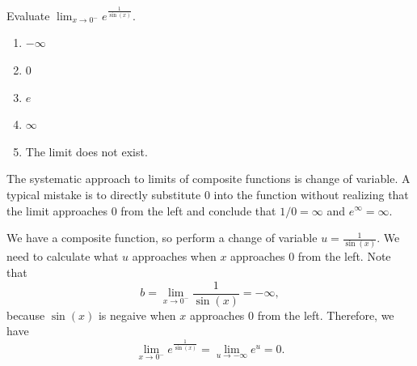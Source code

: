 \documentclass[../main.tex]{subfiles}
\begin{document}
\begin{exercise} \label{ex:midterm-practice-3}
  Evaluate \(\lim_{x \to 0^{-}} e^{\frac{1}{\sin(x)}}\).

  \begin{enumerate}[label=\Alph*.]
    \item \(-\infty\)
    \item \(0\)
    \item \(e\)
    \item \(\infty\)
    \item The limit does not exist.
  \end{enumerate}
  \begin{hint}
    The systematic approach to limits of composite functions is change of variable. A typical mistake is to directly substitute \(0\) into the function without realizing that the limit approaches \(0\) from the left and conclude that \(1/0 = \infty\) and \(e^{\infty} = \infty\).
  \end{hint}
  \begin{solution}
    We have a composite function, so perform a change of variable \(u = \frac{1}{\sin(x)}\). We need to calculate what \(u\) approaches when \(x\) approaches \(0\) from the left. Note that
    \[
      b = \lim_{x \to 0^{-}} \frac{1}{\sin(x)} = -\infty,
    \]
    because \(\sin(x)\) is negaive when \(x\) approaches \(0\) from the left.
    Therefore, we have
    \[
      \lim_{x \to 0^{-}} e^{\frac{1}{\sin(x)}} = \lim_{u \to -\infty} e^u = 0.
    \]
  \end{solution}
\end{exercise}
\vfill
\clearpage
\end{document}
